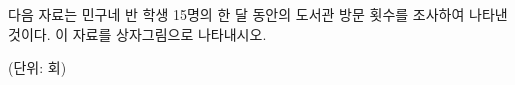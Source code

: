 다음 자료는 민구네 반 학생 15명의 한 달 동안의 도서관 방문 횟수를 조사하여 나타낸 것이다. 이 자료를 상자그림으로 나타내시오.\par{\raggedleft\small (단위: 회)\par}
